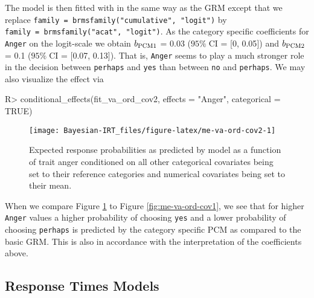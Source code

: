 \documentclass[
]{jss}
\begin{document}
The model is then fitted with  in the same way as the GRM
except that we replace
\texttt{family\ =\ brmsfamily("cumulative",\ "logit")} by
\texttt{family\ =\ brmsfamily("acat",\ "logit")}. As the category
specific coefficients for \texttt{Anger} on the logit-scale we obtain
\(b_{\rm PCM 1}\) = 0.03 (\(95\% \; \text{CI}\) = {[}0, 0.05{]}) and
\(b_{\rm PCM 2}\) = 0.1 (\(95\% \; \text{CI}\) = {[}0.07, 0.13{]}). That
is, \texttt{Anger} seems to play a much stronger role in the decision
between \texttt{perhaps} and \texttt{yes} than between \texttt{no} and
\texttt{perhaps}. We may also visualize the effect via

\begin{CodeChunk}

\begin{CodeInput}
R> conditional_effects(fit_va_ord_cov2, effects = "Anger", categorical = TRUE)
\end{CodeInput}
\begin{figure}

{\centering \texttt{[image: Bayesian-IRT\_files/figure-latex/me-va-ord-cov2-1]} 

}

\caption[Expected response probabilities as predicted by model  as a function of trait anger conditioned on all other categorical covariates being set to their reference categories and numerical covariates being set to their mean]{Expected response probabilities as predicted by model  as a function of trait anger conditioned on all other categorical covariates being set to their reference categories and numerical covariates being set to their mean.}\label{fig:me-va-ord-cov2}
\end{figure}
\end{CodeChunk}

When we compare Figure \ref{fig:me-va-ord-cov2} to Figure
\ref{fig:me-va-ord-cov1}, we see that for higher \texttt{Anger} values a
higher probability of choosing \texttt{yes} and a lower probability of
choosing \texttt{perhaps} is predicted by the category specific PCM as
compared to the basic GRM. This is also in accordance with the
interpretation of the coefficients above.

\hypertarget{response-times}{%
\subsection{Response Times Models}\label{response-times}}
\end{document}
